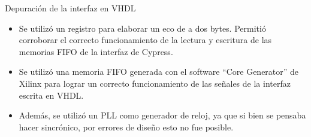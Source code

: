\begin{frame}{Depuración de la interfaz en VHDL}
	\begin{itemize}
		\item Se utilizó un registro para elaborar un eco de a dos bytes. Permitió corroborar el correcto funcionamiento de la lectura y escritura de las memorias FIFO de la interfaz de Cypress.
		\item Se utilizó una memoria FIFO generada con el software ``Core Generator'' de Xilinx para lograr un correcto funcionamiento de las señales de la interfaz escrita en VHDL.
		\item Además, se utilizó un PLL como generador de reloj, ya que si bien se pensaba hacer sincrónico, por errores de diseño esto no fue posible.
	\end{itemize}
\end{frame}
